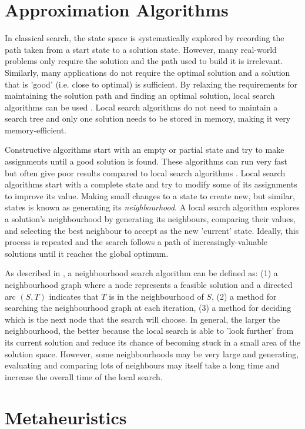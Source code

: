\section{Approximation Algorithms}
In classical search, the state space is systematically explored by recording the path taken from a start state to a solution state. However, many real-world problems only require the solution and the path used to build it is irrelevant. Similarly, many applications do not require the optimal solution and a solution that is 'good' (i.e. close to optimal) is sufficient. By relaxing the requirements for maintaining the solution path and finding an optimal solution, local search algorithms can be used \citep{russell2016artificial}. Local search algorithms do not need to maintain a search tree and only one solution needs to be stored in memory, making it very memory-efficient.

Constructive algorithms start with an empty or partial state and try to make assignments until a good solution is found. These algorithms can run very fast but often give poor results compared to local search algorithms \citep{blum2003metaheuristics}. Local search algorithms start with a complete state and try to modify some of its assignments to improve its value. Making small changes to a state to create new, but similar, states is known as generating its \emph{neighbourhood}. A local search algorithm explores a solution's neighbourhood by generating its neighbours, comparing their values, and selecting the best neighbour to accept as the new 'current' state. Ideally, this process is repeated and the search follows a path of increasingly-valuable solutions until it reaches the global optimum.

As described in \citet{ahuja2002survey}, a neighbourhood search algorithm can be defined as: (1) a neighbourhood graph where a node represents a feasible solution and a directed arc $(S,T)$ indicates that $T$ is in the neighbourhood of $S$, (2) a method for searching the neighbourhood graph at each iteration, (3) a method for deciding which is the next node that the search will choose. In general, the larger the neighbourhood, the better because the local search is able to 'look further' from its current solution and reduce its chance of becoming stuck in a small area of the solution space. However, some neighbourhoods may be very large and generating, evaluating and comparing lots of neighbours may itself take a long time and increase the overall time of the local search.

\section{Metaheuristics}

